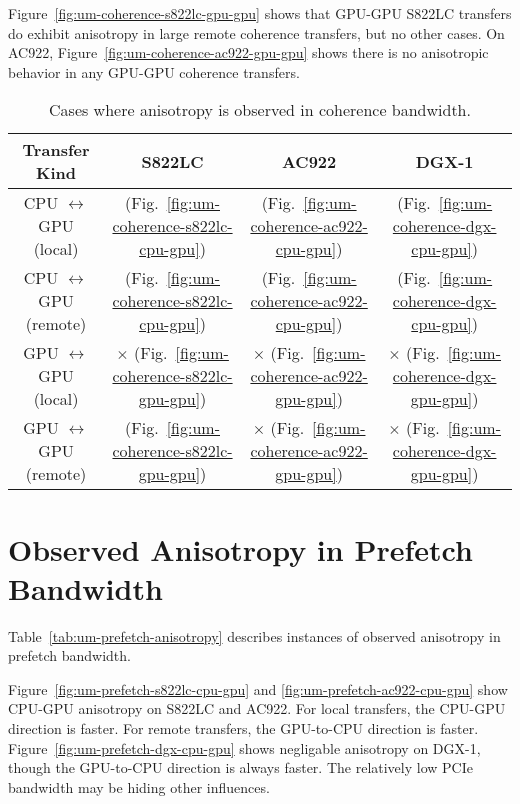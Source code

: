 Figure~\ref{fig:um-coherence-s822lc-gpu-gpu} shows that GPU-GPU S822LC transfers do exhibit anisotropy in large remote coherence transfers, but no other cases.
On AC922, Figure~\ref{fig:um-coherence-ac922-gpu-gpu} shows there is no anisotropic behavior in any GPU-GPU coherence transfers.

\begin{table}[ht]
	\centering
	\caption[Anisotropy in Coherence Bandwidth]{
		Cases where anisotropy is observed in coherence bandwidth.
	}
	\label{tab:um-coherence-anisotropy}
	\begin{tabular}{cccc}
		\hline
		\textbf{Transfer Kind}             & \textbf{S822LC}                                         & \textbf{AC922}                                         & \textbf{DGX-1}                            \\ \hline 
		CPU $\leftrightarrow$ GPU (local)  & \checkmark (Fig.~\ref{fig:um-coherence-s822lc-cpu-gpu}) & \checkmark (Fig.~\ref{fig:um-coherence-ac922-cpu-gpu}) & \checkmark (Fig.~\ref{fig:um-coherence-dgx-cpu-gpu}) \\ \hline
		CPU $\leftrightarrow$ GPU (remote) & \checkmark (Fig.~\ref{fig:um-coherence-s822lc-cpu-gpu}) & \checkmark (Fig.~\ref{fig:um-coherence-ac922-cpu-gpu}) & \checkmark (Fig.~\ref{fig:um-coherence-dgx-cpu-gpu}) \\ \hline
		GPU $\leftrightarrow$ GPU (local)  & $\times$   (Fig.~\ref{fig:um-coherence-s822lc-gpu-gpu}) & $\times$   (Fig.~\ref{fig:um-coherence-ac922-gpu-gpu}) & $\times$ (Fig.~\ref{fig:um-coherence-dgx-gpu-gpu}) \\ \hline
		GPU $\leftrightarrow$ GPU (remote) & \checkmark (Fig.~\ref{fig:um-coherence-s822lc-gpu-gpu}) & $\times$   (Fig.~\ref{fig:um-coherence-ac922-gpu-gpu}) & $\times$ (Fig.~\ref{fig:um-coherence-dgx-gpu-gpu}) \\ \hline
	\end{tabular}
\end{table}

\section{Observed Anisotropy in Prefetch Bandwidth}

Table~\ref{tab:um-prefetch-anisotropy} describes instances of observed anisotropy in prefetch bandwidth.

Figure~\ref{fig:um-prefetch-s822lc-cpu-gpu} and \ref{fig:um-prefetch-ac922-cpu-gpu} show CPU-GPU anisotropy on S822LC and AC922.
For local transfers, the CPU-GPU direction is faster.
For remote transfers, the GPU-to-CPU direction is faster.
Figure~\ref{fig:um-prefetch-dgx-cpu-gpu} shows negligable anisotropy on DGX-1, though the GPU-to-CPU direction is always faster.
The relatively low PCIe bandwidth may be hiding other influences.

